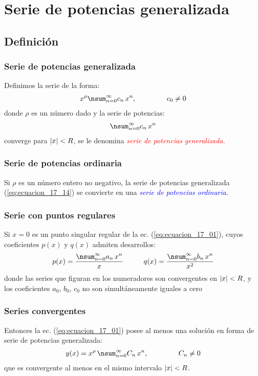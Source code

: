 \documentclass[12pt]{beamer}
\begin{document}
\section{Serie de potencias generalizada}
\subsection{Definición}

\begin{frame}
\frametitle{Serie de potencias generalizada}
Definimos la serie de la forma:
\pause
\begin{align}
x^{\rho} \nsum_{n=0}^{\infty} c_{n} \, x^{n}, \hspace{1.5cm} c_{0} \neq 0
\label{eq:ecuacion_17_14}
\end{align}
donde $\rho$ es un número dado \pause y la serie de potencias:
\pause
\begin{align*}
\nsum_{n=0}^{\infty} c_{n} \, x^{n}
\end{align*}
converge para $\abs{x} < R$, se le denomina \emph{\textcolor{red}{serie de potencias generalizada.}}
\end{frame}
\begin{frame}
\frametitle{Serie de potencias ordinaria}
Si $\rho$ es un número entero no negativo, la serie de potencias generalizada (\ref{eq:ecuacion_17_14}) se convierte en una \emph{\textcolor{blue}{serie de potencias ordinaria}}.
\end{frame}
\begin{frame}
\frametitle{Serie con puntos regulares}
Si $x = 0$ es un punto singular regular de la ec. (\ref{eq:ecuacion_17_01}), cuyos coeficientes $p(x)$ y $q(x)$ admiten desarrollos:
\pause
\begin{align}
p(x) = \dfrac{\displaystyle \nsum_{n=0}^{\infty} a_{n} \, x^{n}}{x} \hspace{1cm} q(x) = \dfrac{\displaystyle \nsum_{n=0}^{\infty} b_{n} \, x^{n}}{x^{2}}
\label{eq:ecuacion_17_15}
\end{align}
\pause
donde las series que figuran en los numeradores son convergentes en $\abs{x} < R$, y los coeficientes $a_{0}$, $b_{0}$, $c_{0}$ no son simultáneamente iguales a cero
\end{frame}
\begin{frame}
\frametitle{Series convergentes}
Entonces la ec. (\ref{eq:ecuacion_17_01}) posee al menos una solución en forma de serie de potencias generalizada:
\pause
\begin{align}
y(x) = x^{\rho} \, \nsum_{n=0}^{\infty} C_{n} \, x^{n}, \hspace{1.5cm} C_{n} \neq 0
\label{eq:ecuacion_17_16}
\end{align}
que es convergente al menos en el mismo intervalo $\abs{x} < R$.
\end{frame}
\end{document}
